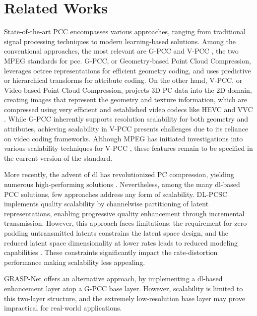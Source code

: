 \section{Related Works}
\label{sec:related}
State-of-the-art PCC encompasses various approaches, ranging from traditional signal processing techniques to modern learning-based solutions. Among the conventional approaches, the most relevant are G-PCC and V-PCC \cite{graziosi2020overview}, the two MPEG standards for \gls{pcc}.
G-PCC, or Geometry-based Point Cloud Compression, leverages octree representations for efficient geometry coding, and uses predictive or hierarchical transforms for attribute coding. On the other hand, V-PCC, or Video-based Point Cloud Compression, projects 3D PC data into the 2D domain, creating images that represent the geometry and texture information, which are compressed using very efficient and established video codecs like HEVC and VVC \cite{bross2021overview}.
While G-PCC inherently supports resolution scalability for both geometry and attributes, achieving scalability in V-PCC presents challenges due to its reliance on video coding frameworks. Although MPEG has initiated investigations into various scalability techniques for V-PCC \cite{vpccscal}, these features remain to be specified in the current version of the standard.

More recently, the advent of \gls{dl} has revolutionized PC compression, yielding numerous high-performing solutions \cite{guarda2024jpeg,quach2020improved,wang2021lossy, wang2022sparse, liu2022pcgformer}. Nevertheless, among the many \gls{dl}-based PCC solutions, few approaches address any form of scalability. DL-PCSC \cite{guarda2020point} implements quality scalability by channelwise partitioning of latent representations, enabling progressive quality enhancement through incremental transmission. However, this approach faces limitations: the requirement for zero-padding untransmitted latents constrains the latent space design, and the reduced latent space dimensionality at lower rates leads to reduced modeling capabilities \cite{balle2018variational}. These constraints significantly impact the rate-distortion performance making scalability less appealing.

GRASP-Net \cite{pang2022grasp} offers an alternative approach, by implementing a \gls{dl}-based enhancement layer atop a G-PCC base layer. However, scalability is limited to this two-layer structure, and the extremely low-resolution base layer may prove impractical for real-world applications.

